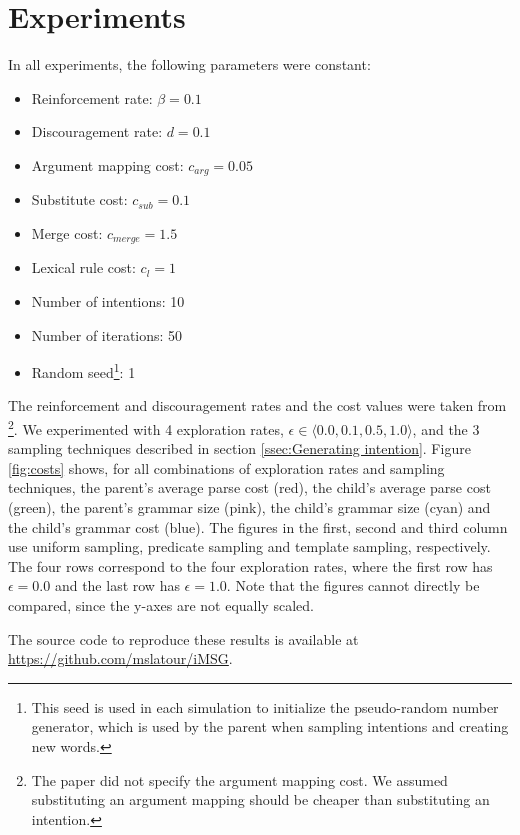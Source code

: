 \documentclass[a4paper]{article}
\begin{document}
\section{Experiments}
\label{sec:experiments}
In all experiments, the following parameters were constant:
\begin{itemize}
\item Reinforcement rate: $\beta = 0.1$
\item Discouragement rate: $d = 0.1$
\item Argument mapping cost: $c_{arg} = 0.05$
\item Substitute cost: $c_{sub} = 0.1$
\item Merge cost: $c_{merge} = 1.5$
\item Lexical rule cost: $c_l = 1$
\item Number of intentions: 10
\item Number of iterations: 50
\item Random seed\footnote{This seed is used in each simulation to initialize the pseudo-random number generator, which is used by the parent when sampling intentions and creating new words.}: 1
\end{itemize}
The reinforcement and discouragement rates and the cost values were taken from \cite{batali1999negotiation}\footnote{The paper did not specify the argument mapping cost. We assumed substituting an argument mapping should be cheaper than substituting an intention.}. We experimented with 4 exploration rates, $\epsilon \in \langle 0.0, 0.1, 0.5, 1.0 \rangle$, and the 3 sampling techniques described in section \ref{ssec:Generating intention}. Figure \ref{fig:costs} shows, for all combinations of exploration rates and sampling techniques, the parent's average parse cost (red), the child's average parse cost (green), the parent's grammar size (pink), the child's grammar size (cyan) and the child's grammar cost (blue). The figures in the first, second and third column use uniform sampling, predicate sampling and template sampling, respectively. The four rows correspond to the four exploration rates, where the first row has $\epsilon = 0.0$ and the last row has $\epsilon = 1.0$. Note that the figures cannot directly be compared, since the y-axes are not equally scaled. 


The source code to reproduce these results is available at \url{https://github.com/mslatour/iMSG}.
\end{document}
